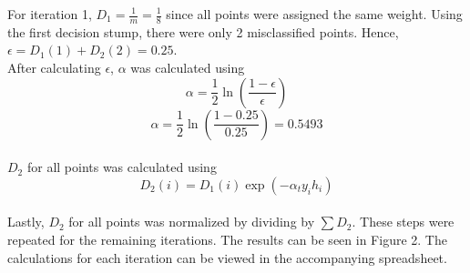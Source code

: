 \documentclass[twoside,12pt]{article}
\begin{document}
\begin{enumerate}
\begin{enumerate}
\begin{itemize}
For iteration 1, $D_1 = \frac{1}{m} = \frac{1}{8}$ since all points were assigned the same weight. Using the first decision stump, there were only 2 misclassified points. Hence, $\epsilon = D_1(1) + D_2(2) = 0.25$.\\

After calculating $\epsilon$, $\alpha$ was calculated using
$$ \alpha = \frac{1}{2} \ln \left(\frac{1-\epsilon}{\epsilon}\right)
$$
$$ \alpha = \frac{1}{2} \ln \left(\frac{1-0.25}{0.25}\right) = 0.5493
$$\\

$D_2$ for all points was calculated using
$$D_2(i) = D_1(i) \exp(-\alpha_t y_i h_i )$$\\

Lastly, $D_2$ for all points was normalized by dividing by $\sum	D_2$. These steps were repeated for the remaining iterations. The results can be seen in Figure 2. The calculations for each iteration can be viewed in the accompanying spreadsheet.


\end{itemize}
\end{enumerate}
\end{enumerate}
\end{document}
